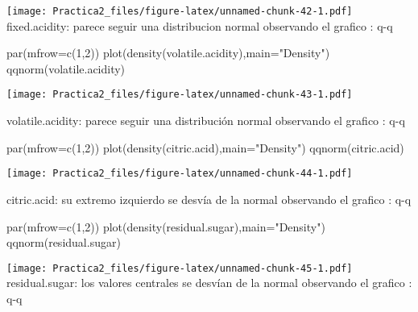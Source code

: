 \documentclass[
]{article}
\newenvironment{Shaded}{\begin{snugshade}}{\end{snugshade}}
\newcommand{\AttributeTok}[1]{\textcolor[rgb]{0.77,0.63,0.00}{#1}}
\newcommand{\DecValTok}[1]{\textcolor[rgb]{0.00,0.00,0.81}{#1}}
\newcommand{\FunctionTok}[1]{\textcolor[rgb]{0.00,0.00,0.00}{#1}}
\newcommand{\NormalTok}[1]{#1}
\newcommand{\StringTok}[1]{\textcolor[rgb]{0.31,0.60,0.02}{#1}}
\begin{document}
\texttt{[image: Practica2\_files/figure-latex/unnamed-chunk-42-1.pdf]}
fixed.acidity: parece seguir una distribucion normal observando el
grafico : q-q

\begin{Shaded}
\begin{Highlighting}[]
\FunctionTok{par}\NormalTok{(}\AttributeTok{mfrow=}\FunctionTok{c}\NormalTok{(}\DecValTok{1}\NormalTok{,}\DecValTok{2}\NormalTok{))}
\FunctionTok{plot}\NormalTok{(}\FunctionTok{density}\NormalTok{(volatile.acidity),}\AttributeTok{main=}\StringTok{"Density"}\NormalTok{)}
\FunctionTok{qqnorm}\NormalTok{(volatile.acidity)}
\end{Highlighting}
\end{Shaded}

\texttt{[image: Practica2\_files/figure-latex/unnamed-chunk-43-1.pdf]}

volatile.acidity: parece seguir una distribución normal observando el
grafico : q-q

\begin{Shaded}
\begin{Highlighting}[]
\FunctionTok{par}\NormalTok{(}\AttributeTok{mfrow=}\FunctionTok{c}\NormalTok{(}\DecValTok{1}\NormalTok{,}\DecValTok{2}\NormalTok{))}
\FunctionTok{plot}\NormalTok{(}\FunctionTok{density}\NormalTok{(citric.acid),}\AttributeTok{main=}\StringTok{"Density"}\NormalTok{)}
\FunctionTok{qqnorm}\NormalTok{(citric.acid)}
\end{Highlighting}
\end{Shaded}

\texttt{[image: Practica2\_files/figure-latex/unnamed-chunk-44-1.pdf]}

citric.acid: su extremo izquierdo se desvía de la normal observando el
grafico : q-q

\begin{Shaded}
\begin{Highlighting}[]
\FunctionTok{par}\NormalTok{(}\AttributeTok{mfrow=}\FunctionTok{c}\NormalTok{(}\DecValTok{1}\NormalTok{,}\DecValTok{2}\NormalTok{))}
\FunctionTok{plot}\NormalTok{(}\FunctionTok{density}\NormalTok{(residual.sugar),}\AttributeTok{main=}\StringTok{"Density"}\NormalTok{)}
\FunctionTok{qqnorm}\NormalTok{(residual.sugar)}
\end{Highlighting}
\end{Shaded}

\texttt{[image: Practica2\_files/figure-latex/unnamed-chunk-45-1.pdf]}
residual.sugar: los valores centrales se desvían de la normal observando
el grafico : q-q
\end{document}
